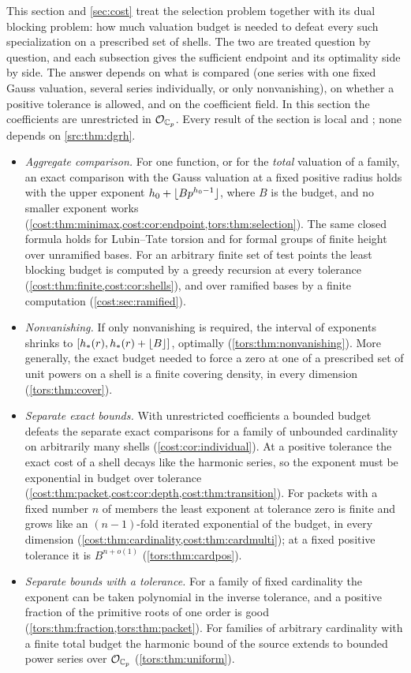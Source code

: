 This section and \cref{sec:cost} treat the selection problem together with its dual
blocking problem: how much valuation budget is needed to defeat every such specialization
on a prescribed set of shells. The two are treated question by question, and each
subsection gives the sufficient endpoint and its optimality side by side. The answer
depends on what is compared (one series with one fixed Gauss valuation, several series
individually, or only nonvanishing), on whether a positive tolerance is allowed, and on
the coefficient field. In this section the coefficients are unrestricted in $\mathcal{O}_{\mathbb{C}_p}$.
Every result of the section is local and \stU; none depends on \cref{src:thm:dgrh}.
\begin{itemize}
\item \emph{Aggregate comparison.} For one function, or for the \emph{total} valuation of
  a family, an exact comparison with the Gauss valuation at a fixed positive radius holds
  with the upper exponent $h_0+\lfloor Bp^{h_0-1}\rfloor$, where $B$ is the budget, and no
  smaller exponent works (\cref{cost:thm:minimax,cost:cor:endpoint,tors:thm:selection}).
  The same closed formula holds for Lubin--Tate torsion and for formal groups of finite
  height over unramified bases. For an arbitrary finite set of test points the least
  blocking budget is computed by a greedy recursion at every tolerance
  (\cref{cost:thm:finite,cost:cor:shells}), and over ramified bases by a finite
  computation (\cref{cost:sec:ramified}).
\item \emph{Nonvanishing.} If only nonvanishing is required, the interval of exponents
  shrinks to $[h_*(r),h_*(r)+\lfloor B\rfloor]$, optimally (\cref{tors:thm:nonvanishing}). More
  generally, the exact budget needed to force a zero at one of a prescribed set of unit
  powers on a shell is a finite covering density, in every dimension
  (\cref{tors:thm:cover}).
\item \emph{Separate exact bounds.} With unrestricted coefficients a bounded budget
  defeats the separate exact comparisons for a family of unbounded cardinality on
  arbitrarily many shells (\cref{cost:cor:individual}). At a positive tolerance the exact cost of a shell decays
  like the harmonic series, so the exponent must be exponential in budget over tolerance
  (\cref{cost:thm:packet,cost:cor:depth,cost:thm:transition}). For packets with a fixed
  number $n$ of members the least exponent at tolerance zero is finite and grows like an
  $(n-1)$-fold iterated exponential of the budget, in every dimension
  (\cref{cost:thm:cardinality,cost:thm:cardmulti}); at a fixed positive tolerance it is
  $B^{n+o(1)}$ (\cref{tors:thm:cardpos}).
\item \emph{Separate bounds with a tolerance.} For a family of fixed cardinality the
  exponent can be taken polynomial in the inverse tolerance, and a positive fraction of the
  primitive roots of one order is good (\cref{tors:thm:fraction,tors:thm:packet}). For
  families of arbitrary cardinality with a finite total budget the harmonic bound of the
  source extends to bounded power series over $\mathcal{O}_{\mathbb{C}_p}$ (\cref{tors:thm:uniform}).
\end{itemize}
